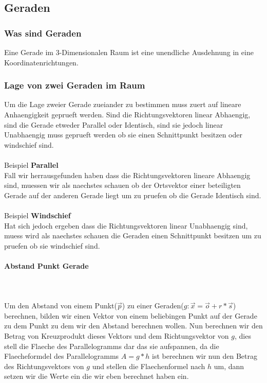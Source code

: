 \documentclass[a4paper]{article} %
\begin{document}
	\subsection{Geraden}
	\subsubsection{Was sind Geraden}
	Eine Gerade im 3-Dimensionalen Raum ist eine unendliche Ausdehnung in eine Koordinatenrichtungen.
	\subsubsection{Lage von zwei Geraden im Raum}
	Um die Lage zweier Gerade zueiander zu bestimmen muss zuert auf lineare Anhaengigkeit geprueft werden.
	Sind die Richtungsvektoren linear Abhaengig, sind die Gerade etweder Parallel oder Identisch, sind sie jedoch linear Unabhaengig
	muss geprueft werden ob sie einen Schnittpunkt besitzen oder windschief sind.
	\\\\Beispiel \textbf{Parallel}
	\\Fall wir herrausgefunden haben dass die Richtungsvektoren lineare Abhaengig sind, muessen wir als naechstes schauen ob der Ortsvektor einer beteiligten Gerade auf der anderen Gerade liegt um zu pruefen ob die Gerade Identisch sind.
	\\\\Beispiel \textbf{Windschief}
	\\Hat sich jedoch ergeben dass die Richtungsvektoren linear  Unabhaengig sind, muess wird als naechstes schauen die Geraden einen Schnittpunkt besitzen um zu pruefen ob sie windschief sind.
	\paragraph{Abstand Punkt Gerade}
	\hspace{0 cm} \\ \noindent \\
	Um den Abstand von einem Punkt($\vec{p}$) zu einer Geraden($g: \vec{x}=\vec{o}+r*\vec{s}$) berechnen, bilden wir einen Vektor von einem beliebingen Punkt auf der Gerade zu dem Punkt zu dem wir den Abstand berechnen wollen. Nun berechnen wir den Betrag von Kreuzprodukt dieses Vektors und dem Richtungsvektor von $g$, dies stell die Flaeche des Parallelogramms dar das sie aufspannen,
	da die Flaecheformdel des Parallelogramms $A=g*h$ ist berechnen wir nun den Betrag des Richtungsvektors von $g$ und stellen die Flaechenformel nach $h$ um, dann setzen wir die Werte ein die wir eben berechnet haben ein.
\end{document}
